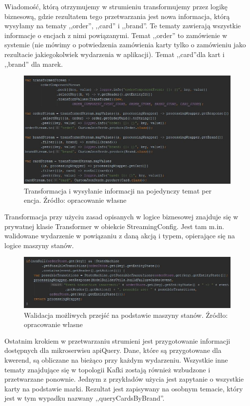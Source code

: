 Wiadomość, którą otrzymujemy w strumieniu transformujemy przez logikę biznesową, gdzie rezultatem tego przetwarzania jest nowa informacja, którą wysyłamy na tematy ,,order'', ,,card'' i ,,brand''. Te tematy zawierają wszystkie informacje o encjach z nimi powiązanymi. Temat ,,order'' to zamówienie w systemie (nie mówimy o potwiedzenia zamówienia karty tylko o zamówieniu jako rezultacie jakiegokolwiek wydarzenia w aplikacji). Temat ,,card''dla kart i ,,brand'' dla marek. 

\begin{figure}[h!]
  \centering
    \includegraphics[width=1.0\textwidth]{images/streamscommand2.JPG}
  \caption{Transformacja i wysyłanie informacji na pojedynczy temat per encja. Źródło: opracowanie własne }
\end{figure}
\FloatBarrier

Transformacja przy użyciu zasad opisanych w logice biznesowej znajduje się w prywatnej klasie Transformer w obiekcie StreamingConfig. Jest tam m.in. walidowane wydarzenie w powiązaniu z daną akcją i typem, opierające się na logice maszyny stanów.

\begin{figure}[h!]
  \centering
    \includegraphics[width=1.0\textwidth]{images/streamscommand3.JPG}
  \caption{Walidacja możliwych przejść na podstawie maszyny stanów. Źródło: opracowanie własne }
\end{figure}
\FloatBarrier


Ostatnim krokiem w przetwarzaniu strumieni jest przygotowanie informacji dostępnych dla mikroserwisu apiQuery.
Dane, które są przygotowane dla kwerend, są obliczane na bieżąco przy każdym wydarzeniu. Wszystkie inne tematy znajdujące się w topologii Kafki zostają również wzbudzone i przetwarzane ponownie.
Jednym z przykładów użycia jest zapytanie o wszystkie karty na podstawie marki. Rezultat jest zapisywany na osobnym temacie, który jest w tym wypadku nazwany ,,queryCardsByBrand''.

